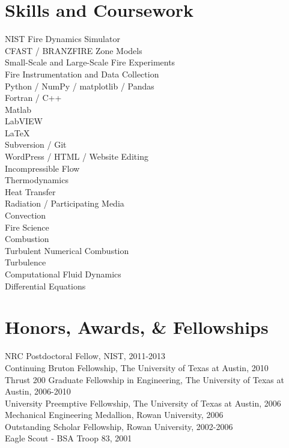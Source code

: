 \documentclass[10pt,letterpaper]{article}
\begin{document}

\section*{Skills and Coursework}
\begin{multicols}{2}
NIST Fire Dynamics Simulator \\
CFAST / BRANZFIRE Zone Models \\
Small-Scale and Large-Scale Fire Experiments \\
Fire Instrumentation and Data Collection \\
Python / NumPy / matplotlib / Pandas \\
Fortran / C++ \\
Matlab \\
LabVIEW \\
\LaTeX \\
Subversion / Git \\
WordPress / HTML / Website Editing \\

Incompressible Flow \\
Thermodynamics \\
Heat Transfer \\
Radiation / Participating Media \\
Convection \\
Fire Science \\
Combustion \\
Turbulent Numerical Combustion \\
Turbulence \\
Computational Fluid Dynamics \\
Differential Equations \\
\end{multicols}

\section*{Honors, Awards, \& Fellowships}

NRC Postdoctoral Fellow, NIST, 2011-2013 \\
Continuing Bruton Fellowship, The University of Texas at Austin, 2010 \\
Thrust 200 Graduate Fellowship in Engineering, The University of Texas at Austin, 2006-2010 \\
University Preemptive Fellowship, The University of Texas at Austin, 2006 \\
Mechanical Engineering Medallion, Rowan University, 2006 \\
Outstanding Scholar Fellowship, Rowan University, 2002-2006 \\
Eagle Scout - BSA Troop 83, 2001 \\
\end{document}
